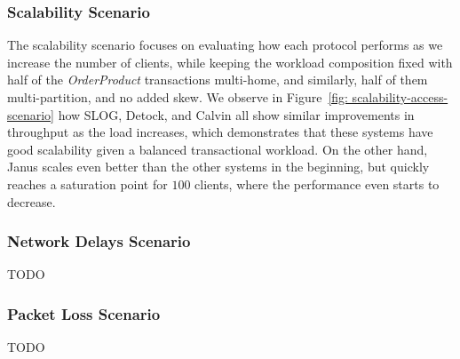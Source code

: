 \subsubsection{Scalability Scenario}
\label{subsubsec: scalability scenario}
The scalability scenario focuses on evaluating how each protocol performs as we increase the number of clients, while keeping the workload composition fixed with half of the \textit{OrderProduct} transactions multi-home, and similarly, half of them multi-partition, and no added skew. We observe in Figure~\ref{fig: scalability-access-scenario} how SLOG, Detock, and Calvin all show similar improvements in throughput as the load increases, which demonstrates that these systems have good scalability given a balanced transactional workload. On the other hand, Janus scales even better than the other systems in the beginning, but quickly reaches a saturation point for $100$ clients, where the performance even starts to decrease.

\subsubsection{Network Delays Scenario}
TODO

\subsubsection{Packet Loss Scenario}
TODO





